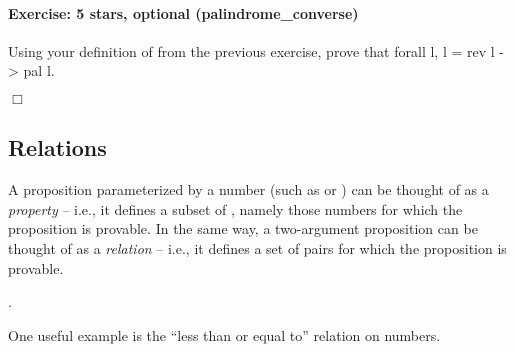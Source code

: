 \documentclass[12pt]{report}
\begin{document}
\paragraph{Exercise: 5 stars, optional (palindrome\_converse)}

 Using your definition of  from the previous exercise, prove
    that
     forall l, l = rev l -> pal l.
\begin{coqdoccode}
\coqdocemptyline
\end{coqdoccode}
\ensuremath{\Box} \begin{coqdoccode}
\coqdocemptyline
\end{coqdoccode}
\subsection{Relations}



 A proposition parameterized by a number (such as  or
    ) can be thought of as a \textit{property} -- i.e., it defines
    a subset of , namely those numbers for which the proposition
    is provable.  In the same way, a two-argument proposition can be
    thought of as a \textit{relation} -- i.e., it defines a set of pairs for
    which the proposition is provable. \begin{coqdoccode}
\coqdocemptyline
\coqdocnoindent
{} .\coqdoceol
\coqdocemptyline
\end{coqdoccode}
One useful example is the ``less than or equal to''
    relation on numbers. 
\end{document}
